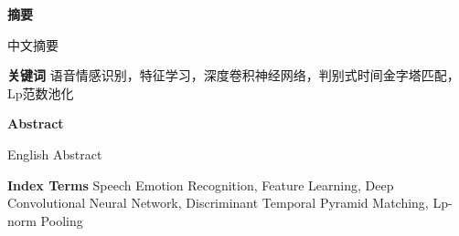 \noindent{}
\begin{center}\textbf{摘要}\quad{}\end{center}

中文摘要

\vskip 1.5cm
\noindent{}\textbf{关键词}\quad{}
语音情感识别，特征学习，深度卷积神经网络，判别式时间金字塔匹配，Lp范数池化


\newpage
\begin{center}\textbf{Abstract}\quad{}\end{center}

English Abstract


\vskip 1.5cm
\noindent{}\textbf{Index Terms}\quad{}
Speech Emotion Recognition, Feature Learning, Deep Convolutional Neural Network, Discriminant Temporal Pyramid Matching, Lp-norm Pooling  